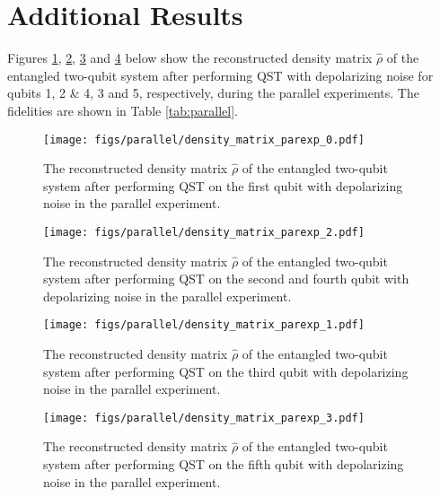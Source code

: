 \documentclass[a4paper,12pt]{article}
\begin{document}
\newpage
\printbibliography

\newpage
\appendix
{}
\setcounter{page}{1}
\section{Additional Results} \label{A}
Figures \ref{fig:q1}, \ref{fig:q3}, \ref{fig:q2} and \ref{fig:q4} below show the reconstructed density matrix $\hat{\rho}$ of the entangled two-qubit system after performing QST with depolarizing noise for qubits 1, 2 \& 4, 3 and 5, respectively, during the parallel experiments. The fidelities are shown in Table \ref{tab:parallel}.
\begin{figure}[H]
    \centering
    \texttt{[image: figs/parallel/density\_matrix\_parexp\_0.pdf]}
    \caption{The reconstructed density matrix $\hat{\rho}$ of the entangled two-qubit system after performing QST on the first qubit with depolarizing noise in the parallel experiment.}
    \label{fig:q1}
\end{figure}

\begin{figure}[H]
    \centering
    \texttt{[image: figs/parallel/density\_matrix\_parexp\_2.pdf]}
    \caption{The reconstructed density matrix $\hat{\rho}$ of the entangled two-qubit system after performing QST on the second and fourth qubit with depolarizing noise in the parallel experiment.}
    \label{fig:q3}
\end{figure}

\begin{figure}[H]
    \centering
    \texttt{[image: figs/parallel/density\_matrix\_parexp\_1.pdf]}
    \caption{The reconstructed density matrix $\hat{\rho}$ of the entangled two-qubit system after performing QST on the third qubit with depolarizing noise in the parallel experiment.}
    \label{fig:q2}
\end{figure}

\begin{figure}[H]
    \centering
    \texttt{[image: figs/parallel/density\_matrix\_parexp\_3.pdf]}
    \caption{The reconstructed density matrix $\hat{\rho}$ of the entangled two-qubit system after performing QST on the fifth qubit with depolarizing noise in the parallel experiment.}
    \label{fig:q4}
\end{figure}
\end{document}
